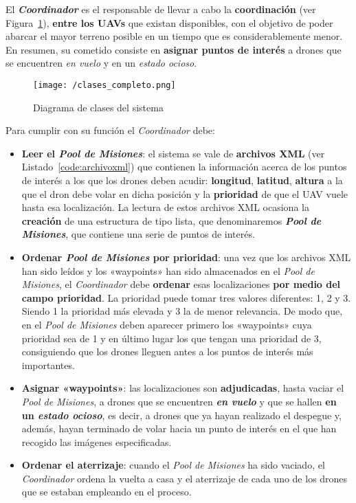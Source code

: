 El \textbf{\textit{Coordinador}} es el responsable de llevar a cabo la \textbf{coordinación} (ver Figura~\ref{fig:diagclases}), \textbf{entre los \acs{UAV}s} que existan disponibles, con el objetivo de poder abarcar el mayor terreno posible en un tiempo que es considerablemente menor. En resumen, su cometido consiste en \textbf{asignar puntos de interés} a drones que se encuentren \textit{en vuelo} y en un \textit{estado ocioso}. 

\begin{figure}[!h]
\begin{center}
\texttt{[image: /clases\_completo.png]}
\caption[Diagrama de clases del sistema]{Diagrama de clases del sistema}
\label{fig:diagclases}
\end{center}
\end{figure}

Para cumplir con su función el \textit{Coordinador} debe:

\begin{itemize}
\item \textbf{Leer el \textit{Pool de Misiones}}: el sistema se vale de \textbf{archivos XML} (ver Listado~\ref{code:archivoxml}) que contienen la información acerca de los puntos de interés a los que los drones deben acudir: \textbf{longitud}, \textbf{latitud}, \textbf{altura} a la que el dron debe volar en dicha posición y la \textbf{prioridad} de que el \acs{UAV} vuele hasta esa localización. La lectura de estos archivos XML ocasiona la \textbf{creación} de una estructura de tipo lista, que denominaremos \textbf{\textit{Pool de Misiones}}, que contiene una serie de puntos de interés. 
\item \textbf{Ordenar \textit{Pool de Misiones} por prioridad}: una vez que los archivos XML han sido leídos y los «waypoints» han sido almacenados en el \textit{Pool de Misiones}, el \textit{Coordinador} debe \textbf{ordenar} esas localizaciones \textbf{por medio del campo prioridad}. La prioridad puede tomar tres valores diferentes: 1, 2 y 3. Siendo 1 la prioridad más elevada y 3 la de menor relevancia. De modo que, en el \textit{Pool de Misiones} deben aparecer primero los «waypoints» cuya prioridad sea de 1 y en último lugar los que tengan una prioridad de 3, consiguiendo que los drones lleguen antes a los puntos de interés más importantes.
\item \textbf{Asignar «waypoints»}: las localizaciones son \textbf{adjudicadas}, hasta vaciar el \textit{Pool de Misiones}, a drones que se encuentren \textbf{\textit{en vuelo}} y que se hallen \textbf{en un \textit{estado ocioso}}, es decir, a drones que ya hayan realizado el despegue y, además, hayan terminado de volar hacia un punto de interés en el que han recogido las imágenes especificadas. 
\item \textbf{Ordenar el aterrizaje}: cuando el \textit{Pool de Misiones} ha sido vaciado, el \textit{Coordinador} ordena la vuelta a casa y el aterrizaje de cada uno de los drones que se estaban empleando en el proceso.
\end{itemize}

